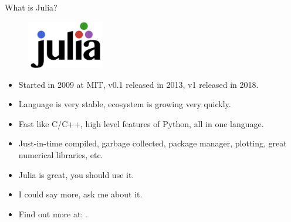 \begin{frame}{What is Julia?}

\begin{figure}[T]
  \includegraphics[width=0.3\textwidth]{
    slides/assets/what-is-itensor-julia.jpg
  }
\end{figure}

\begin{itemize}[<+->]

  \item Started in 2009 at MIT, v0.1 released in 2013, v1 released in 2018.
  \item Language is very stable, ecosystem is growing very quickly.
  \item Fast like C/C++, high level features of Python, all in one language.
  \item Just-in-time compiled, garbage collected, package manager, plotting, great numerical libraries, etc.
  \item Julia is great, you should use it.
  \item I could say more, ask me about it.
  \item Find out more at: .

\end{itemize}

\end{frame}
